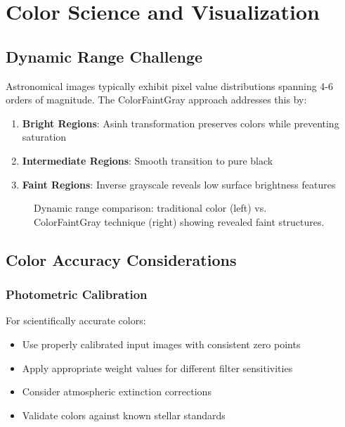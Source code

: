 \documentclass[11pt,a4paper]{article}
\begin{document}
\section{Color Science and Visualization}

\subsection{Dynamic Range Challenge}

Astronomical images typically exhibit pixel value distributions spanning 4-6
orders of magnitude. The ColorFaintGray approach addresses this by:

\begin{enumerate}
\item \textbf{Bright Regions}: Asinh transformation preserves colors while
preventing saturation
\item \textbf{Intermediate Regions}: Smooth transition to pure black
\item \textbf{Faint Regions}: Inverse grayscale reveals low surface
brightness features
\end{enumerate}

\begin{figure}[H]
\centering
\caption{Dynamic range comparison: traditional color (left) vs.
ColorFaintGray technique (right) showing revealed faint structures.}
\label{fig:dynamic-range}
\end{figure}

\subsection{Color Accuracy Considerations}

\subsubsection{Photometric Calibration}

For scientifically accurate colors:

\begin{itemize}[leftmargin=*]
\item Use properly calibrated input images with consistent zero points
\item Apply appropriate weight values for different filter sensitivities
\item Consider atmospheric extinction corrections
\item Validate colors against known stellar standards
\end{itemize}
\end{document}
